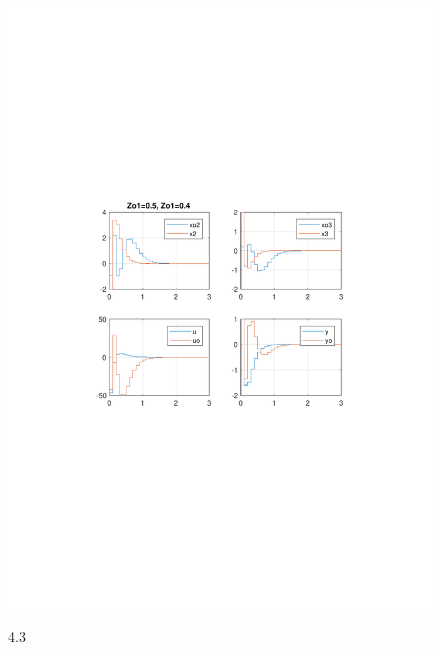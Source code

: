 \documentclass{article}
\begin{document}
\begin{figure}[H]
\includegraphics[clip, trim=2cm 10cm 2cm 9.5cm, width=1.00\textwidth]{../rys/zad4_rys3.pdf}
\label{fig:rys4.3}
\caption{4.3}
\end{figure}
\end{document}
